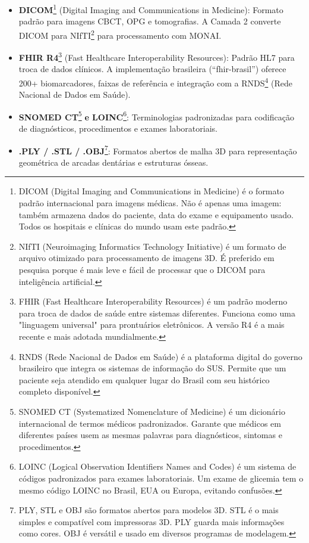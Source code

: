 \begin{itemize}
    \item \textbf{DICOM}\footnote{DICOM (Digital Imaging and Communications in Medicine) é o formato padrão internacional para imagens médicas. Não é apenas uma imagem: também armazena dados do paciente, data do exame e equipamento usado. Todos os hospitais e clínicas do mundo usam este padrão.} (Digital Imaging and Communications in Medicine): Formato padrão para imagens CBCT, OPG e tomografias. A Camada 2 converte DICOM para NIfTI\footnote{NIfTI (Neuroimaging Informatics Technology Initiative) é um formato de arquivo otimizado para processamento de imagens 3D. É preferido em pesquisa porque é mais leve e fácil de processar que o DICOM para inteligência artificial.} para processamento com MONAI.
    
    \item \textbf{FHIR R4}\footnote{FHIR (Fast Healthcare Interoperability Resources) é um padrão moderno para troca de dados de saúde entre sistemas diferentes. Funciona como uma "linguagem universal" para prontuários eletrônicos. A versão R4 é a mais recente e mais adotada mundialmente.} (Fast Healthcare Interoperability Resources): Padrão HL7 para troca de dados clínicos. A implementação brasileira (``fhir-brasil'') oferece 200+ biomarcadores, faixas de referência e integração com a RNDS\footnote{RNDS (Rede Nacional de Dados em Saúde) é a plataforma digital do governo brasileiro que integra os sistemas de informação do SUS. Permite que um paciente seja atendido em qualquer lugar do Brasil com seu histórico completo disponível.} (Rede Nacional de Dados em Saúde).
    
    \item \textbf{SNOMED CT}\footnote{SNOMED CT (Systematized Nomenclature of Medicine) é um dicionário internacional de termos médicos padronizados. Garante que médicos em diferentes países usem as mesmas palavras para diagnósticos, sintomas e procedimentos.} \textbf{e LOINC}\footnote{LOINC (Logical Observation Identifiers Names and Codes) é um sistema de códigos padronizados para exames laboratoriais. Um exame de glicemia tem o mesmo código LOINC no Brasil, EUA ou Europa, evitando confusões.}: Terminologias padronizadas para codificação de diagnósticos, procedimentos e exames laboratoriais.
    
    \item \textbf{.PLY / .STL / .OBJ}\footnote{PLY, STL e OBJ são formatos abertos para modelos 3D. STL é o mais simples e compatível com impressoras 3D. PLY guarda mais informações como cores. OBJ é versátil e usado em diversos programas de modelagem.}: Formatos abertos de malha 3D para representação geométrica de arcadas dentárias e estruturas ósseas.
\end{itemize}


